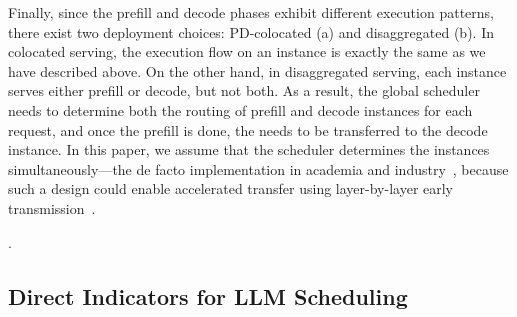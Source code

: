 Finally, since the prefill and decode phases exhibit different execution patterns,
there exist two deployment choices: PD-colocated (a) and disaggregated (b).
In colocated serving, the execution flow on an instance is exactly the same
as we have described above.
On the other hand, in disaggregated serving,
each instance serves either prefill or decode, but not both.
As a result, the global scheduler needs to determine both the routing of prefill and decode instances
for each request,
and once the prefill is done, the {\kvcache} needs to be transferred to the decode instance. 
In this paper, we assume that the scheduler determines the instances simultaneously---the de facto
implementation in academia and industry~\cite{}, because such a design 
could enable accelerated {\kvcache} transfer using layer-by-layer early transmission~\cite{DBLP:conf/isca/PatelCZSGMB24}.

.
\fi

\iffalse
\subsection{Direct Indicators for LLM Scheduling}
\label{sec:sys-metrics-llm-scheduling}


